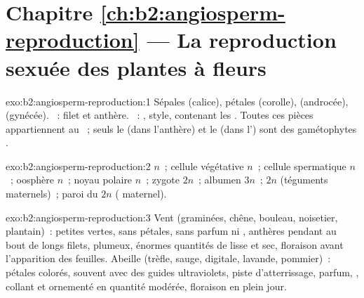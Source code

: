 \section*{Chapitre \ref{ch:b2:angiosperm-reproduction} --- La reproduction sexuée des plantes à fleurs}

\begin{solution}{exo:b2:angiosperm-reproduction:1}
Sépales (calice), pétales (corolle),  (androcée), 
(gynécée). ~: filet et anthère. ~: , style,
 contenant les . Toutes ces pièces appartiennent au
 ~; seuls le  (dans l'anthère) et le
 (dans l') sont des gamétophytes .
\end{solution}

\begin{solution}{exo:b2:angiosperm-reproduction:2}
 $n$~; cellule végétative $n$~; cellule spermatique $n$~;
oosphère $n$~; noyau polaire $n$~; zygote $2n$~; albumen $3n$~;
 $2n$ (téguments maternels)~; paroi du  $2n$
( maternel).
\end{solution}

\begin{solution}{exo:b2:angiosperm-reproduction:3}
Vent (graminées, chêne, bouleau, noisetier, plantain)~: petites 
vertes, sans pétales, sans parfum ni , anthères pendant au bout
de longs filets,  plumeux, énormes quantités de  lisse
et sec, floraison avant l'apparition des feuilles. Abeille (trèfle,
sauge, digitale, lavande, pommier)~: pétales colorés, souvent avec des
guides ultraviolets, piste d'atterrissage, parfum, , 
collant et ornementé en quantité modérée, floraison en plein jour.
\end{solution}

